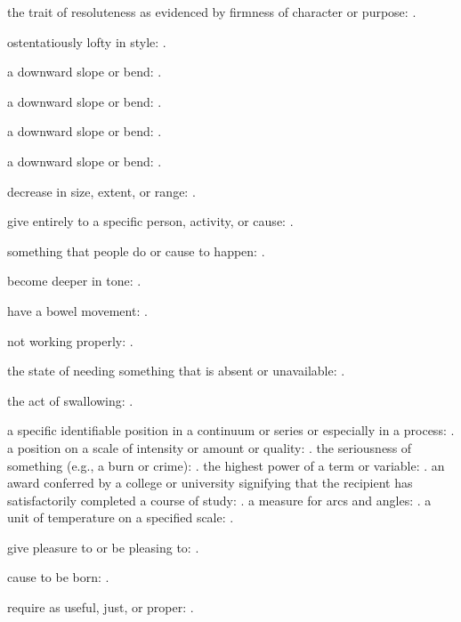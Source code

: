   the trait of resoluteness as evidenced by firmness of character or purpose: .

  ostentatiously lofty in style: .

  a downward slope or bend: .

  a downward slope or bend: .

  a downward slope or bend: .

  a downward slope or bend: .

  decrease in size, extent, or range: .

  give entirely to a specific person, activity, or cause: .

  something that people do or cause to happen: .

  become deeper in tone: .

  have a bowel movement: .

  not working properly: .

  the state of needing something that is absent or unavailable: .

  the act of swallowing: .

  a specific identifiable position in a continuum or series or especially in a process: . a position on a scale of intensity or amount or quality: . the seriousness of something (e.g., a burn or crime): . the highest power of a term or variable: . an award conferred by a college or university signifying that the recipient has satisfactorily completed a course of study: . a measure for arcs and angles: . a unit of temperature on a specified scale: .

  give pleasure to or be pleasing to: .

  cause to be born: .

  require as useful, just, or proper: .


